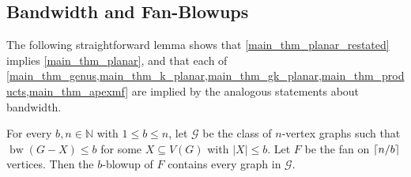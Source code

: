 \documentclass{patmorin}
\renewcommand{\leq}{\leqslant}
\newcommand{\defin}[1]{\emph{\textcolor{brightmaroon}{#1}}}
\DeclareMathOperator{\bw}{bw}
\newcommand{\NN}{\mathbb{N}}
\newcommand{\GG}{\mathcal{G}}
\begin{document}






\subsection{Bandwidth and Fan-Blowups}


The following straightforward lemma shows that \cref{main_thm_planar_restated} implies \cref{main_thm_planar}, and that each of \cref{main_thm_genus,main_thm_k_planar,main_thm_gk_planar,main_thm_products,main_thm_apexmf} are implied by the analogous statements about bandwidth.

\begin{lem}
\label{UniversalBlowup}
For every $b,n\in\NN$ with $1\leq b\leq n$, let $\GG$ be the class of $n$-vertex graphs such that $\bw(G-X)\leq b$ for some $X\subseteq V(G)$ with $|X|\leq b$. 
Let $F$ be the fan on ${\lceil n/b \rceil}$ vertices. 
Then the $b$-blowup of $F$ contains every graph in $\GG$.
\end{lem}
\end{document}
